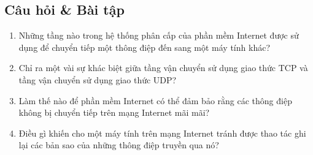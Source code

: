 \subsection*{Câu hỏi \& Bài tập}

\begin{enumerate}
\item Những tầng nào trong hệ thống phân cấp của phần mềm Internet được sử dụng để chuyển
  tiếp một thông điệp đến sang một máy tính khác?

\item Chỉ ra một vài sự khác biệt giữa tầng vận chuyển sử dụng giao thức TCP và tầng vận
  chuyển sử dụng giao thức UDP?

\item Làm thế nào để phần mềm Internet có thể đảm bảo rằng các thông điệp không bị chuyển
  tiếp trên mạng Internet mãi mãi?

\item Điều gì khiến cho một máy tính trên mạng Internet tránh được thao tác ghi lại các
  bản sao của những thông điệp truyền qua nó?

\end{enumerate}


